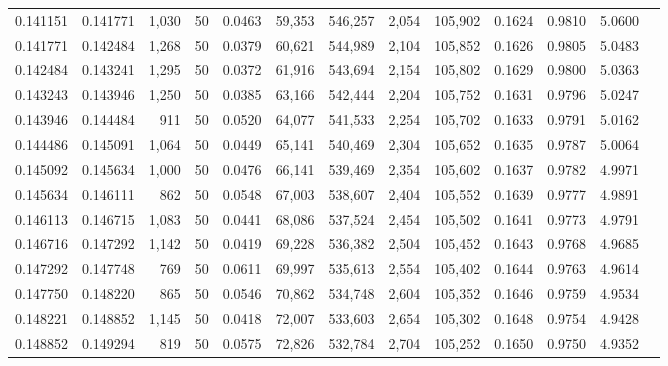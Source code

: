 \begin{tabular}{rrrrrrrrrrrrr}
0.141151 & 0.141771 & 1,030 &  50 &                                     0.0463 &  59,353 & 546,257 &   2,054 & 105,902 & 0.1624 & 0.9810 & 5.0600 \\
0.141771 & 0.142484 & 1,268 &  50 &                                     0.0379 &  60,621 & 544,989 &   2,104 & 105,852 & 0.1626 & 0.9805 & 5.0483 \\
0.142484 & 0.143241 & 1,295 &  50 &                                     0.0372 &  61,916 & 543,694 &   2,154 & 105,802 & 0.1629 & 0.9800 & 5.0363 \\
0.143243 & 0.143946 & 1,250 &  50 &                                     0.0385 &  63,166 & 542,444 &   2,204 & 105,752 & 0.1631 & 0.9796 & 5.0247 \\
0.143946 & 0.144484 &   911 &  50 &                                     0.0520 &  64,077 & 541,533 &   2,254 & 105,702 & 0.1633 & 0.9791 & 5.0162 \\
0.144486 & 0.145091 & 1,064 &  50 &                                     0.0449 &  65,141 & 540,469 &   2,304 & 105,652 & 0.1635 & 0.9787 & 5.0064 \\
0.145092 & 0.145634 & 1,000 &  50 &                                     0.0476 &  66,141 & 539,469 &   2,354 & 105,602 & 0.1637 & 0.9782 & 4.9971 \\
0.145634 & 0.146111 &   862 &  50 &                                     0.0548 &  67,003 & 538,607 &   2,404 & 105,552 & 0.1639 & 0.9777 & 4.9891 \\
0.146113 & 0.146715 & 1,083 &  50 &                                     0.0441 &  68,086 & 537,524 &   2,454 & 105,502 & 0.1641 & 0.9773 & 4.9791 \\
0.146716 & 0.147292 & 1,142 &  50 &                                     0.0419 &  69,228 & 536,382 &   2,504 & 105,452 & 0.1643 & 0.9768 & 4.9685 \\
0.147292 & 0.147748 &   769 &  50 &                                     0.0611 &  69,997 & 535,613 &   2,554 & 105,402 & 0.1644 & 0.9763 & 4.9614 \\
0.147750 & 0.148220 &   865 &  50 &                                     0.0546 &  70,862 & 534,748 &   2,604 & 105,352 & 0.1646 & 0.9759 & 4.9534 \\
0.148221 & 0.148852 & 1,145 &  50 &                                     0.0418 &  72,007 & 533,603 &   2,654 & 105,302 & 0.1648 & 0.9754 & 4.9428 \\
0.148852 & 0.149294 &   819 &  50 &                                     0.0575 &  72,826 & 532,784 &   2,704 & 105,252 & 0.1650 & 0.9750 & 4.9352 \\

\end{tabular}
